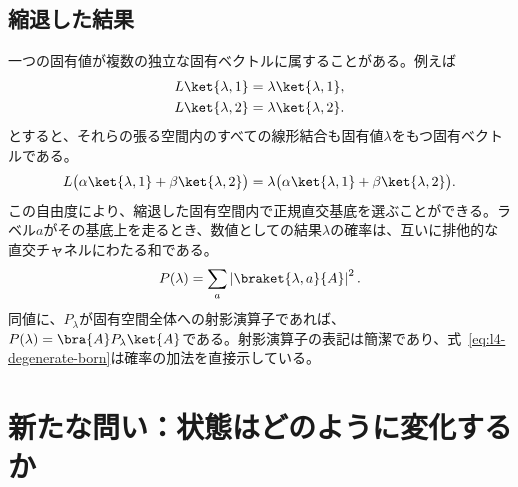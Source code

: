 \subsection{縮退した結果}

一つの固有値が複数の独立な固有ベクトルに属することがある。例えば
\begin{align}
L\ket{\lambda,1}&=\lambda\ket{\lambda,1},\\
L\ket{\lambda,2}&=\lambda\ket{\lambda,2}.
\end{align}
とすると、それらの張る空間内のすべての線形結合も固有値\(\lambda\)をもつ固有ベクトルである。
\begin{equation}
L\bigl(\alpha\ket{\lambda,1}+\beta\ket{\lambda,2}\bigr)
=
\lambda\bigl(\alpha\ket{\lambda,1}+\beta\ket{\lambda,2}\bigr).
\end{equation}
この自由度により、縮退した固有空間内で正規直交基底を選ぶことができる。ラベル\(a\)がその基底上を走るとき、数値としての結果\(\lambda\)の確率は、互いに排他的な直交チャネルにわたる和である。
\begin{equation}
P(\lambda)=\sum_a\left|\braket{\lambda,a}{A}\right|^2.
\label{eq:l4-degenerate-born}
\end{equation}
同値に、\(P_\lambda\)が固有空間全体への射影演算子であれば、\(P(\lambda)=\bra{A}P_\lambda\ket{A}\)である。射影演算子の表記は簡潔であり、式~\eqref{eq:l4-degenerate-born}は確率の加法を直接示している。

\begin{classroomqa}
\end{classroomqa}

\begin{classroomqa}
\end{classroomqa}

\section{新たな問い：状態はどのように変化するか}

